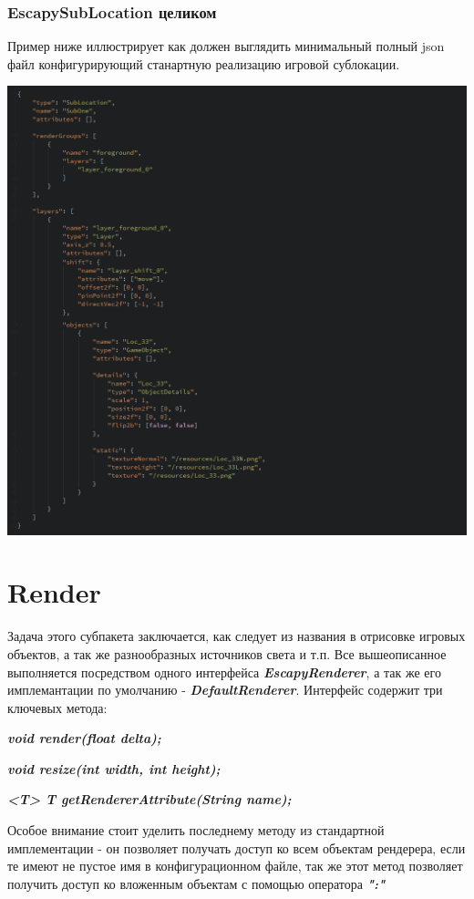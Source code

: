 \documentclass[11pt]{report}
\newenvironment{itemize*}%
  {\begin{itemize}%
    \setlength{\itemsep}{2pt}%
    \setlength{\parskip}{0.75pt}}%
  {\end{itemize}}
\begin{document}
\subsubsection{EscapySubLocation целиком}
Пример ниже иллюстрирует как должен выглядить минимальный полный json файл конфигурирующий станартную реализацию игровой сублокации.
\begin{center}
	\includegraphics[width=1.2\linewidth]{img/21.png} 
  	\label{img:210} 
\end{center} 


\section{Render}
Задача этого субпакета заключается, как следует из названия в отрисовке игровых объектов, а так же разнообразных источников света и т.п. Все вышеописанное выполняется посредством одного интерфейса \textit{\textbf{EscapyRenderer}}, а так же его имплемантации по умолчанию - \textit{\textbf{DefaultRenderer}}. Интерфейс содержит три ключевых метода:

\begin{itemize*}
	\item \textit{\textbf{void render(float delta);}}
	\item \textit{\textbf{void resize(int width, int height);}}
	\item \textit{\textbf{<T> T getRendererAttribute(String name);}}
\end{itemize*}
Особое внимание стоит уделить последнему методу из стандартной имплементации - он позволяет получать доступ ко всем объектам рендерера, если те имеют не пустое имя в конфигурационном файле, так же этот метод позволяет получить доступ ко вложенным объектам с помощью оператора \textit{\textbf{":"}}
\end{document}
